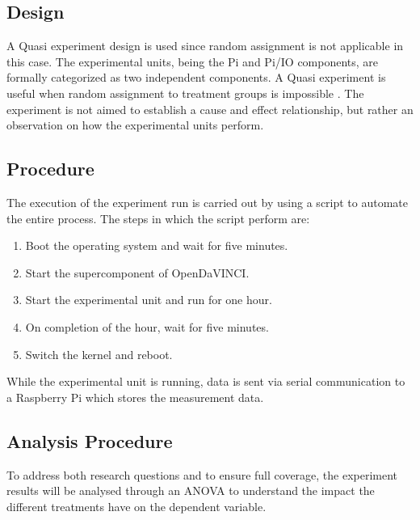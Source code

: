 \subsection{Design}
A Quasi experiment design is used since random assignment is not applicable in this case. The experimental units, being the Pi and Pi/IO components, are
formally categorized as two independent components. A Quasi experiment is useful when random assignment to treatment groups is impossible \cite{juristo2003lecture}. The experiment is not aimed to establish a cause and effect relationship, but rather an observation on how the experimental units perform.
\subsection{Procedure}

The execution of the experiment run is carried out by using a script to automate the entire process. The steps in which the script perform are:\\

\begin{enumerate}  
\item Boot the operating system and wait for five minutes.  
\item Start the supercomponent of OpenDaVINCI.
\item Start the experimental unit and run for one hour.
\item On completion of the hour, wait for five minutes.
\item Switch the kernel and reboot.\\ 
\end{enumerate}

While the experimental unit is running, data is sent via serial communication to a Raspberry Pi which stores the measurement data. 


\subsection{Analysis Procedure}

To address both research questions and to ensure full coverage, the experiment results will be analysed through an ANOVA to understand the impact the different treatments have on the dependent variable.\\













